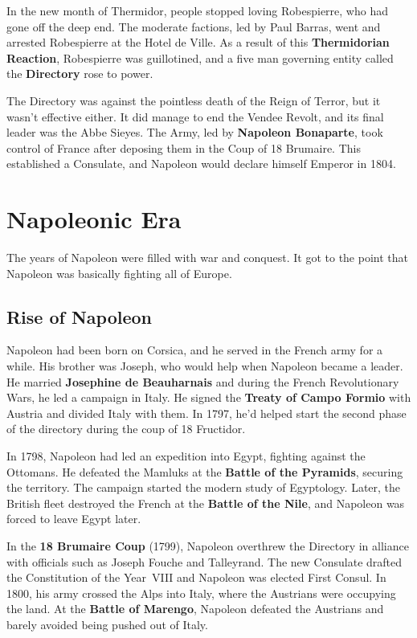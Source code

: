 In the new month of Thermidor, people stopped loving Robespierre, who had gone off the deep end.
The moderate factions, led by Paul Barras, went and arrested Robespierre at the Hotel de Ville.
As a result of this \textbf{Thermidorian Reaction}, Robespierre was guillotined,
and a five man governing entity called the \textbf{Directory} rose to power.

The Directory was against the pointless death of the Reign of Terror, but it wasn't effective either.
It did manage to end the Vendee Revolt, and its final leader was the Abbe Sieyes.
The Army, led by \textbf{Napoleon Bonaparte},
took control of France after deposing them in the Coup of 18 Brumaire.
This established a Consulate, and Napoleon would declare himself Emperor in 1804.

\section{Napoleonic Era}

The years of Napoleon were filled with war and conquest.
It got to the point that Napoleon was basically fighting all of Europe.

\subsection*{Rise of Napoleon}

Napoleon had been born on Corsica, and he served in the French army for a while.
His brother was Joseph, who would help when Napoleon became a leader.
He married \textbf{Josephine de Beauharnais} and during the French Revolutionary Wars,
he led a campaign in Italy.
He signed the \textbf{Treaty of Campo Formio} with Austria and divided Italy with them.
In 1797, he'd helped start the second phase of the directory during the coup of 18 Fructidor.

In 1798, Napoleon had led an expedition into Egypt, fighting against the Ottomans.
He defeated the Mamluks at the \textbf{Battle of the Pyramids}, securing the territory.
The campaign started the modern study of Egyptology.
Later, the British fleet destroyed the French at the \textbf{Battle of the Nile},
and Napoleon was forced to leave Egypt later.

In the \textbf{18 Brumaire Coup} (1799),
Napoleon overthrew the Directory in alliance with officials such as Joseph Fouche and Talleyrand.
The new Consulate drafted the Constitution of the Year~VIII and Napoleon was elected First Consul.
In 1800, his army crossed the Alps into Italy, where the Austrians were occupying the land.
At the \textbf{Battle of Marengo},
Napoleon defeated the Austrians and barely avoided being pushed out of Italy.

